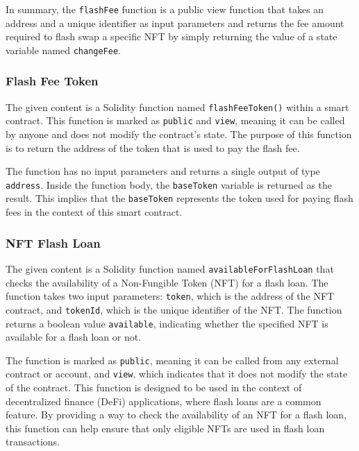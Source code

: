 In summary, the \texttt{flashFee} function is a public view function
that takes an address and a unique identifier as input parameters and
returns the fee amount required to flash swap a specific NFT by simply
returning the value of a state variable named \texttt{changeFee}.

\hypertarget{flash-fee-token}{%
\subsubsection{Flash Fee Token}\label{flash-fee-token}}

The given content is a Solidity function named \texttt{flashFeeToken()}
within a smart contract. This function is marked as \texttt{public} and
\texttt{view}, meaning it can be called by anyone and does not modify
the contract's state. The purpose of this function is to return the
address of the token that is used to pay the flash fee.

The function has no input parameters and returns a single output of type
\texttt{address}. Inside the function body, the \texttt{baseToken}
variable is returned as the result. This implies that the
\texttt{baseToken} represents the token used for paying flash fees in
the context of this smart contract.

\hypertarget{nft-flash-loan}{%
\subsubsection{NFT Flash Loan}\label{nft-flash-loan}}

The given content is a Solidity function named
\texttt{availableForFlashLoan} that checks the availability of a
Non-Fungible Token (NFT) for a flash loan. The function takes two input
parameters: \texttt{token}, which is the address of the NFT contract,
and \texttt{tokenId}, which is the unique identifier of the NFT. The
function returns a boolean value \texttt{available}, indicating whether
the specified NFT is available for a flash loan or not.

The function is marked as \texttt{public}, meaning it can be called from
any external contract or account, and \texttt{view}, which indicates
that it does not modify the state of the contract. This function is
designed to be used in the context of decentralized finance (DeFi)
applications, where flash loans are a common feature. By providing a way
to check the availability of an NFT for a flash loan, this function can
help ensure that only eligible NFTs are used in flash loan transactions.

